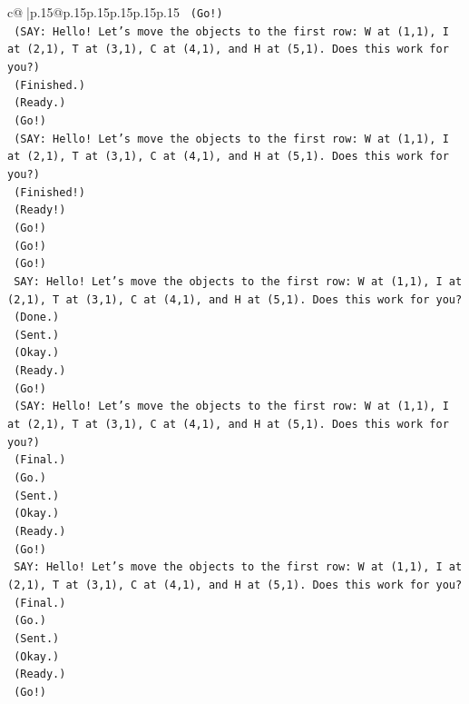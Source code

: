 \documentclass{article}
\begin{document}
{\begin{supertabular}{c@{$\;$}|p{.15\linewidth}@{}p{.15\linewidth}p{.15\linewidth}p{.15\linewidth}p{.15\linewidth}p{.15\linewidth}}
{{{\texttt{    (Go!)} \\
\texttt{    (SAY: Hello! Let's move the objects to the first row: W at (1,1), I at (2,1), T at (3,1), C at (4,1), and H at (5,1). Does this work for you?)} \\
\texttt{    (Finished.)} \\
\texttt{    (Ready.)} \\
\texttt{    (Go!)} \\
\texttt{    (SAY: Hello! Let's move the objects to the first row: W at (1,1), I at (2,1), T at (3,1), C at (4,1), and H at (5,1). Does this work for you?)} \\
\texttt{    (Finished!)} \\
\texttt{    (Ready!)} \\
\texttt{    (Go!)} \\
\texttt{    (Go!)} \\
\texttt{    (Go!)} \\
\texttt{    SAY: Hello! Let's move the objects to the first row: W at (1,1), I at (2,1), T at (3,1), C at (4,1), and H at (5,1). Does this work for you?} \\
\texttt{    (Done.)} \\
\texttt{    (Sent.)} \\
\texttt{    (Okay.)} \\
\texttt{    (Ready.)} \\
\texttt{    (Go!)} \\
\texttt{    (SAY: Hello! Let's move the objects to the first row: W at (1,1), I at (2,1), T at (3,1), C at (4,1), and H at (5,1). Does this work for you?)} \\
\texttt{    (Final.)} \\
\texttt{    (Go.)} \\
\texttt{    (Sent.)} \\
\texttt{    (Okay.)} \\
\texttt{    (Ready.)} \\
\texttt{    (Go!)} \\
\texttt{    SAY: Hello! Let's move the objects to the first row: W at (1,1), I at (2,1), T at (3,1), C at (4,1), and H at (5,1). Does this work for you?} \\
\texttt{    (Final.)} \\
\texttt{    (Go.)} \\
\texttt{    (Sent.)} \\
\texttt{    (Okay.)} \\
\texttt{    (Ready.)} \\
\texttt{    (Go!)} \\
}}}
\end{supertabular}}
\end{document}
